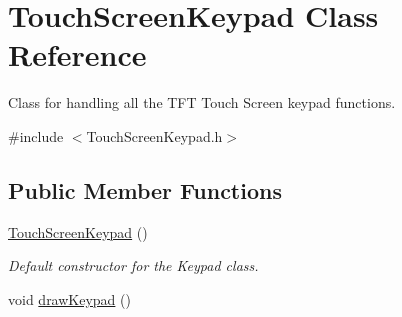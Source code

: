 \hypertarget{class_touch_screen_keypad}{\section{Touch\+Screen\+Keypad Class Reference}
\label{class_touch_screen_keypad}
}


Class for handling all the T\+F\+T Touch Screen keypad functions.  




{\ttfamily \#include $<$Touch\+Screen\+Keypad.\+h$>$}

\subsection*{Public Member Functions}
\begin{DoxyCompactItemize}
\item 
\hypertarget{class_touch_screen_keypad_a607f12b597d5abcf58c68fa0b872c27f}{\hyperlink{class_touch_screen_keypad_a607f12b597d5abcf58c68fa0b872c27f}{Touch\+Screen\+Keypad} ()}\label{class_touch_screen_keypad_a607f12b597d5abcf58c68fa0b872c27f}

\begin{DoxyCompactList}\small\item\em Default constructor for the Keypad class. \end{DoxyCompactList}\item 
\hypertarget{class_touch_screen_keypad_ab6f5683d6144923d22cdc1557a04e505}{void \hyperlink{class_touch_screen_keypad_ab6f5683d6144923d22cdc1557a04e505}{draw\+Keypad} ()}\label{class_touch_screen_keypad_ab6f5683d6144923d22cdc1557a04e505}


\end{DoxyCompactItemize}

